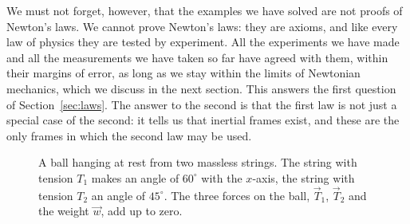 \documentclass[11pt,a4paper]{article}
\begin{document}
We must not forget, however, that the examples we have solved are not proofs of Newton's laws. We cannot prove Newton's laws: they are axioms, and like every law of
physics they are tested by experiment. All the experiments we have made and all the measurements we
have taken so far have agreed with them, within their margins of error, as long as we stay within
the limits of Newtonian mechanics, which we discuss in the next section. This answers the first
question of Section~\ref{sec:laws}. The answer to the second is that the first law is not just a
special case of the second: it tells us that inertial frames exist, and these are the only frames
in which the second law may be used.

\begin{figure}[ht]
\centering
{}
\caption{A ball hanging at rest from two massless strings. The string with tension $T_1$ makes an
angle of $60^\circ$ with the $x$-axis, the string with tension $T_2$ an angle of $45^\circ$. The
three forces on the ball, $\vec{T}_1$, $\vec{T}_2$ and the weight $\vec{w}$, add up to
zero.}\label{fig:hanging}
\end{figure}
\end{document}
